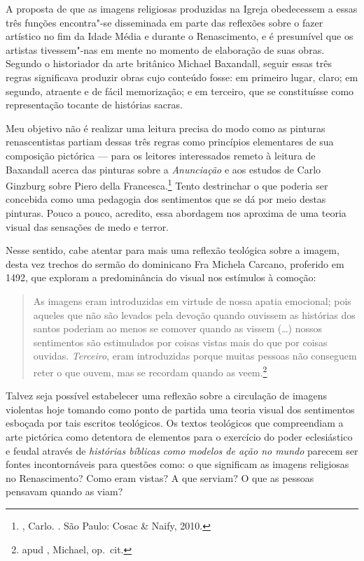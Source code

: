 A proposta de que as imagens religiosas produzidas na Igreja obedecessem
a essas três funções encontra"-se disseminada em parte das reflexões
sobre o fazer artístico no fim da Idade Média e durante o Renascimento,
e é presumível que os artistas tivessem"-nas em mente no momento de
elaboração de suas obras. Segundo o historiador da arte britânico
Michael Baxandall, seguir essas três regras significava produzir obras
cujo conteúdo fosse: em primeiro lugar, claro; em segundo, atraente e de
fácil memorização; e em terceiro, que se constituísse como representação
tocante de histórias sacras.

Meu objetivo não é realizar uma leitura precisa do modo como as pinturas
renascentistas partiam dessas três regras como princípios elementares de
sua composição pictórica --- para os leitores interessados remeto à
leitura de Baxandall acerca das pinturas sobre a \emph{Anunciação} e aos
estudos de Carlo Ginzburg sobre Piero della Francesca.\footnote{,
  Carlo. {}. São Paulo: Cosac \& Naify, 2010.} Tento
destrinchar o que poderia ser concebida como uma pedagogia dos
sentimentos que se dá por meio destas pinturas. Pouco a pouco, acredito,
essa abordagem nos aproxima de uma teoria visual das sensações de medo e
terror.

Nesse sentido, cabe atentar para mais uma reflexão teológica sobre a
imagem, desta vez trechos do sermão do dominicano Fra Michela Carcano,
proferido em 1492, que exploram a predominância do visual nos estímulos
à comoção:

\begin{quote}
As imagens eram introduzidas em virtude de nossa apatia
emocional; pois aqueles que não são levados pela devoção quando ouvissem
as histórias dos santos poderiam ao menos se comover quando as vissem
(\ldots{}) nossos sentimentos são estimulados por coisas vistas mais do que
por coisas ouvidas. \emph{Terceiro}, eram introduzidas porque muitas
pessoas não conseguem reter o que ouvem, mas se recordam quando as
veem.\footnote{ apud , Michael, op.~cit.}
\end{quote}

Talvez seja possível estabelecer uma reflexão sobre a circulação de
imagens violentas hoje tomando como ponto de partida uma teoria visual
dos sentimentos esboçada por tais escritos teológicos. Os textos
teológicos que compreendiam a arte pictórica como detentora de elementos
para o exercício do poder eclesiástico e feudal através de
\emph{histórias bíblicas como modelos de ação no mundo} parecem ser
fontes incontornáveis para questões como: o que significam as imagens
religiosas no Renascimento? Como eram vistas? A que serviam? O que as
pessoas pensavam quando as viam?

